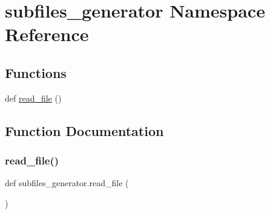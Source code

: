 \hypertarget{namespacesubfiles__generator}{}\section{subfiles\+\_\+generator Namespace Reference}
\label{namespacesubfiles__generator}
\subsection*{Functions}
\begin{DoxyCompactItemize}
\item 
def \hyperlink{namespacesubfiles__generator_ae4057a32539f835494f8bfcc388bf072}{read\+\_\+file} ()
\end{DoxyCompactItemize}


\subsection{Function Documentation}
\mbox{\label{namespacesubfiles__generator_ae4057a32539f835494f8bfcc388bf072}} 
\subsubsection{\texorpdfstring{read\+\_\+file()}{read\_file()}}
{\footnotesize\ttfamily def subfiles\+\_\+generator.\+read\+\_\+file (\begin{DoxyParamCaption}{ }\end{DoxyParamCaption})}

